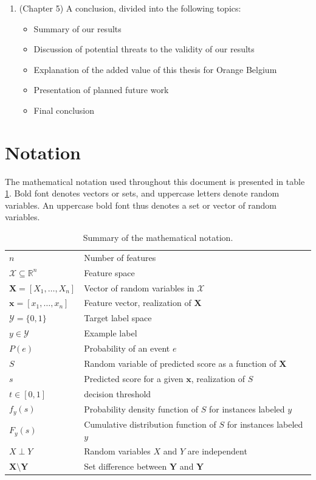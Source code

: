 \begin{enumerate}
    \item (Chapter 5) A conclusion, divided into the following topics:
    \begin{itemize}
        \item Summary of our results
        \item Discussion of potential threats to the validity of our results
        \item Explanation of the added value of this thesis for Orange Belgium
        \item Presentation of planned future work
        \item Final conclusion
    \end{itemize}
\end{enumerate}

\section{Notation}

The mathematical notation used throughout this document is presented in table
\ref{tab:notation}. Bold font denotes vectors or sets, and uppercase letters
denote random variables. An uppercase bold font thus denotes a set or vector of
random variables.

\begin{table}[h]
    \centering
    \begin{tabular}{ll}
        \toprule
        $n$ & Number of features\\
        $\mathcal X\subseteq\mathbb R^n$ & Feature space\\
        $\bm X = [X_1,\dots,X_n]$ & Vector of random variables in $\mathcal X$\\
        $\bm x = [x_1,\dots,x_n]$ & Feature vector, realization of $\bm X$\\
        $\mathcal Y=\{0, 1\}$ & Target label space\\
        $y\in\mathcal Y$ & Example label \\
        $P(e)$ & Probability of an event $e$\\
        $S$ & Random variable of predicted score as a function of $\bm X$\\
        $s$ & Predicted score for a given $\bm x$, realization of $S$\\
        $t\in [0, 1]$ & decision threshold\\
        $f_y(s)$ & Probability density function of $S$ for instances labeled $y$\\
        $F_y(s)$ & Cumulative distribution function of $S$ for instances labeled $y$\\
        $X\perp Y$ & Random variables $X$ and $Y$ are independent\\
        $\bm X\setminus \bm Y$ & Set difference between $\bm Y$ and $\bm Y$\\
        \bottomrule
    \end{tabular}
    \caption{Summary of the mathematical notation.}
    \label{tab:notation}
\end{table}
